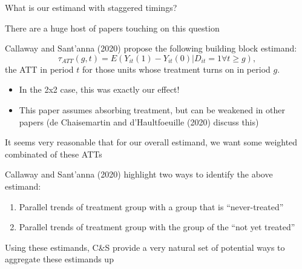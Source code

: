 \documentclass[notes,11pt, aspectratio=169]{beamer}
\newenvironment{wideitemize}{\itemize\addtolength{\itemsep}{10pt}}{\enditemize}
\begin{document}
\begin{frame}{What is our estimand with staggered timings?} 
  \begin{wideitemize}
  \item There are a huge host of papers touching on this question
  \item Callaway and Sant'anna (2020) propose the following building block estimand:
    \begin{equation}
      \tau_{ATT}(g,t) = E(Y_{it}(1) - Y_{it}(0) | D_{it} = 1 \forall t \geq g), 
    \end{equation}
    the ATT in period $t$ for those units whose treatment turns on in period $g$.
    \begin{itemize}
    \item In the 2x2 case, this was exactly our effect!
    \item This paper assumes absorbing treatment, but can be weakened in
      other papers (de Chaisemartin and d'Haultfoeuille (2020) discuss
      this)
    \end{itemize}
  \item It seems very reasonable that for our overall estimand, we
    want some weighted combinated of these ATTs
  \item Callaway and Sant'anna (2020) highlight two ways to identify the above estimand:
    \begin{enumerate}
    \item Parallel trends of treatment group with a group that is ``never-treated'' 
    \item Parallel trends of treatment group with the group of the ``not yet treated''
    \end{enumerate}
  \item Using these estimands, C\&S provide a very natural set of
    potential ways to aggregate these estimands up
  \end{wideitemize}

\end{frame}
\end{document}
